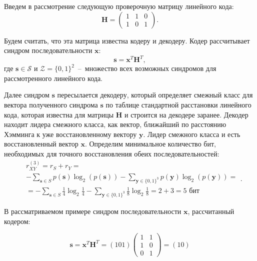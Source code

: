 \begin{enumerate}
Введем в рассмотрение следующую проверочную матрицу линейного кода:
\begin{equation*}
\mathbf{H} = \begin{pmatrix} 
    1 & 1 & 0 \\
    1 & 0 & 1
\end{pmatrix}.
\end{equation*}

Будем считать, что эта матрица известна кодеру и декодеру. Кодер рассчитывает синдром последовательности $\mathbf{x}$:
\begin{equation*}
\mathbf{s} = \mathbf{x}^T\mathbf{H}^T,
\end{equation*}
где $\mathbf{s} \in \mathcal{S}$ и $\mathcal{Z} = \{0,1\}^2$~--~множество всех возможных синдромов для рассмотренного линейного кода.

Далее синдром $\mathbf{s}$ пересылается декодеру, который определяет смежный класс для вектора полученного синдрома $\mathbf{s}$ по таблице стандартной расстановки линейного кода, которая известна для матрицы $\mathbf{H}$ и строится на декодере заранее. Декодер находит лидера смежного класса, как вектор, ближайший по расстоянию Хэмминга к уже восстановленному вектору $\mathbf{y}$. Лидер смежного класса и есть восстановленный вектор $\mathbf{x}$. Определим минимальное количество бит, необходимых для точного восстановления обеих последовательностей:
\begin{equation*}
\begin{split}
& r_{XY}^{(3)} = r_S + r_Y = \\
& - \sum\limits_{ \mathbf{s} \in S} p(\mathbf{s}) \log_2(p(\mathbf{s})) - 
\sum\limits_{ \mathbf{y} \in \{0,1\}^3} p(\mathbf{y}) \log_2(p(\mathbf{y})) = \\
& = - \sum\limits_{ \mathbf{s} \in S} \frac{1}{4} \log_2\frac{1}{4} - 
\sum\limits_{ \mathbf{y} \in \{0,1\}^3} \frac{1}{8} \log_2\frac{1}{8} = 2 + 3 = 5 \text{ бит}
\end{split}.
\end{equation*}

В рассматриваемом примере синдром последовательности $\mathbf{x}$, рассчитанный кодером:

\begin{equation*}
\mathbf{s} = \mathbf{x}^T\mathbf{H}^T = (101) \begin{pmatrix} 1 & 1 \\ 1 & 0 \\ 0 & 1 \end{pmatrix} = (10)
\end{equation*}


\end{enumerate}

